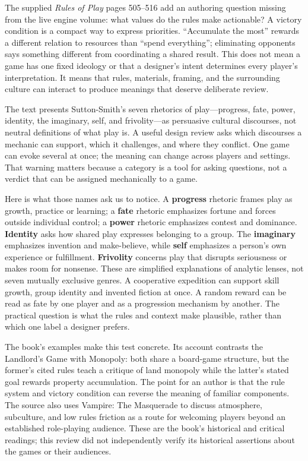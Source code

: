 The supplied \emph{Rules of Play} pages 505--516 add an authoring question missing from the live engine volume: what values do the rules make actionable? A victory condition is a compact way to express priorities. ``Accumulate the most'' rewards a different relation to resources than ``spend everything''; eliminating opponents says something different from coordinating a shared result. This does not mean a game has one fixed ideology or that a designer's intent determines every player's interpretation. It means that rules, materials, framing, and the surrounding culture can interact to produce meanings that deserve deliberate review.

The text presents Sutton-Smith's seven rhetorics of play---progress, fate, power, identity, the imaginary, self, and frivolity---as persuasive cultural discourses, not neutral definitions of what play is. A useful design review asks which discourses a mechanic can support, which it challenges, and where they conflict. One game can evoke several at once; the meaning can change across players and settings. That warning matters because a category is a tool for asking questions, not a verdict that can be assigned mechanically to a game.

Here is what those names ask us to notice. A \textbf{progress} rhetoric frames play as growth, practice or learning; a \textbf{fate} rhetoric emphasizes fortune and forces outside individual control; a \textbf{power} rhetoric emphasizes contest and dominance. \textbf{Identity} asks how shared play expresses belonging to a group. The \textbf{imaginary} emphasizes invention and make-believe, while \textbf{self} emphasizes a person's own experience or fulfillment. \textbf{Frivolity} concerns play that disrupts seriousness or makes room for nonsense. These are simplified explanations of analytic lenses, not seven mutually exclusive genres. A cooperative expedition can support skill growth, group identity and invented fiction at once. A random reward can be read as fate by one player and as a progression mechanism by another. The practical question is what the rules and context make plausible, rather than which one label a designer prefers.

The book's examples make this test concrete. Its account contrasts the Landlord's Game with Monopoly: both share a board-game structure, but the former's cited rules teach a critique of land monopoly while the latter's stated goal rewards property accumulation. The point for an author is that the rule system and victory condition can reverse the meaning of familiar components. The source also uses Vampire: The Masquerade to discuss atmosphere, subculture, and low rules friction as a route for welcoming players beyond an established role-playing audience. These are the book's historical and critical readings; this review did not independently verify its historical assertions about the games or their audiences.

